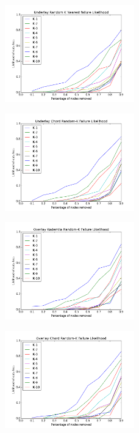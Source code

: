\documentclass[conference]{IEEEtran}
\begin{document}
\begin{figure}[h]
	\includegraphics[width=0.5\textwidth]{figs/underlay_kad_random}
\end{figure}
\begin{figure}[h]
	\includegraphics[width=0.5\textwidth]{figs/underlay_chord_random}
\end{figure}
\begin{figure}[h]
	\includegraphics[width=0.5\textwidth]{figs/overlay_kad_random}
\end{figure}
\begin{figure}[h]
	\includegraphics[width=0.5\textwidth]{figs/overlay_chord_random}
\end{figure}
\end{document}
